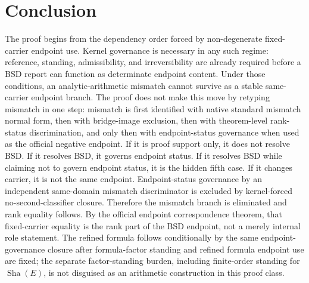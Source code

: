 \documentclass[11pt]{article}
\newcommand{\Sha}{\operatorname{Sha}}
\begin{document}
\section*{Conclusion}
The proof begins from the dependency order forced by non-degenerate fixed-carrier endpoint use. Kernel governance is necessary in any such regime: reference, standing, admissibility, and irreversibility are already required before a BSD report can function as determinate endpoint content. Under those conditions, an analytic-arithmetic mismatch cannot survive as a stable same-carrier endpoint branch. The proof does not make this move by retyping mismatch in one step: mismatch is first identified with native standard mismatch normal form, then with bridge-image exclusion, then with theorem-level rank-status discrimination, and only then with endpoint-status governance when used as the official negative endpoint. If it is proof support only, it does not resolve BSD. If it resolves BSD, it governs endpoint status. If it resolves BSD while claiming not to govern endpoint status, it is the hidden fifth case. If it changes carrier, it is not the same endpoint. Endpoint-status governance by an independent same-domain mismatch discriminator is excluded by kernel-forced no-second-classifier closure. Therefore the mismatch branch is eliminated and rank equality follows. By the official endpoint correspondence theorem, that fixed-carrier equality is the rank part of the BSD endpoint, not a merely internal role statement. The refined formula follows conditionally by the same endpoint-governance closure after formula-factor standing and refined formula endpoint use are fixed; the separate factor-standing burden, including finite-order standing for $\Sha(E)$, is not disguised as an arithmetic construction in this proof class.

\appendix
\end{document}
